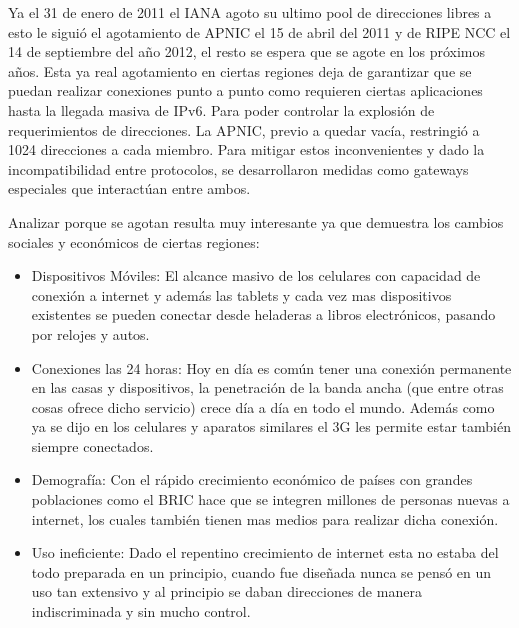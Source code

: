 \documentclass[11pt,a4paper]{article}
\begin{document}
Ya el 31 de enero de 2011 el IANA agoto su ultimo pool de direcciones libres a esto le siguió el 
agotamiento de APNIC el 15 de abril del 2011 y de RIPE NCC el 14 de septiembre del año 2012, el 
resto se espera que se agote en los próximos años. Esta ya real agotamiento en ciertas regiones deja
de garantizar que se puedan realizar conexiones punto a punto como requieren ciertas aplicaciones
hasta la llegada masiva de IPv6. Para poder controlar la explosión de requerimientos de direcciones.
La APNIC, previo a quedar vacía, restringió a 1024 direcciones a cada miembro.
Para mitigar estos inconvenientes y dado la incompatibilidad entre protocolos, se desarrollaron 
medidas como gateways especiales que interactúan entre ambos.\par
Analizar porque se agotan resulta muy interesante ya que demuestra los cambios sociales y económicos 
de ciertas regiones:
\begin{itemize}
\item Dispositivos Móviles: El alcance masivo de los celulares con capacidad de conexión a internet 
y además las tablets y cada vez mas dispositivos existentes se pueden conectar desde heladeras a 
libros electrónicos, pasando por relojes y autos.
\item Conexiones las 24 horas: Hoy en día es común tener una conexión permanente en las casas y 
dispositivos, la penetración de la banda ancha (que entre otras cosas ofrece dicho servicio) crece 
día a día en todo el mundo. Además como ya se dijo en los celulares y aparatos similares el 3G les 
permite estar también siempre conectados.
\item Demografía: Con el rápido crecimiento económico de países con grandes poblaciones como el BRIC 
hace que se integren millones de personas nuevas a internet, los cuales también tienen mas medios 
para realizar dicha conexión.
\item Uso ineficiente: Dado el repentino crecimiento de internet esta no estaba del todo preparada 
en un principio, cuando fue diseñada nunca se pensó en un uso tan extensivo y al principio se daban 
direcciones de manera indiscriminada y sin mucho control.
\end{itemize}
\end{document}
